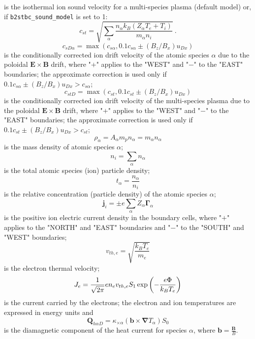 \documentclass[a4paper,10pt]{report}
\begin{document}
is the isothermal ion sound velocity for a multi-species plasma (default model)
or, if {\tt b2stbc\_sound\_model} is set to 1:
\begin{equation}
c_{st}=\sqrt{\sum_{\alpha}\frac{n_\alpha k_{B} \left( Z_\alpha T_e + T_i \right)}{m_\alpha n_i}}~.
\end{equation}
\begin{equation}
c_{sD\alpha}=\max\left(c_{s\alpha},0.1c_{s\alpha}\pm\left( B_{z}/B_{x}\right)
u_{Dx}\right)   \label{11}
\end{equation}
is the conditionally corrected ion drift velocity of the atomic species $\alpha$
due to the poloidal $\mathbf{E \times B}$ drift, where "$+$" applies to the
"WEST" and "$-$" to the "EAST" boundaries; the approximate correction is used only if
$0.1c_{s\alpha}\pm\left( B_{z}/B_{x}\right) u_{Dx}>c_{s\alpha}$;
\begin{equation}
c_{stD}=\max\left(c_{st},0.1c_{st}\pm\left( B_{z}/B_{x}\right) u_{Dx}\right)
\label{12}
\end{equation}
is the conditionally corrected ion drift velocity of the multi-species plasma due
to the poloidal $\mathbf{E \times B}$ drift, where "$+$" applies to the "WEST"
and "$-$" to the "EAST" boundaries; the approximate correction is used only if
$0.1c_{st}\pm\left( B_{z}/B_{x}\right) u_{Dx}>c_{st}$;
\begin{equation}
\rho_{\alpha}=A_{\alpha}m_{p}n_{\alpha}=m_{\alpha}n_{\alpha}   \label{13}
\end{equation}
is the mass density of atomic species $\alpha$;
\begin{equation}
n_{i}=\sum_{\alpha}n_{\alpha}   \label{14}
\end{equation}
is the total atomic species (ion) particle density;
\begin{equation}
t_{\alpha}=\frac{n_{\alpha}}{n_{i}}   \label{15}
\end{equation}
is the relative concentration (particle density) of the atomic species $\alpha$;
\begin{equation}
\mathbf{j}_{i}=\pm e\sum_{\alpha}Z_{\alpha}\mathbf{\Gamma}_{\alpha}
\label{16}
\end{equation}
is the positive ion electric current density in the boundary cells, where
"$+$" applies to the "NORTH" and "EAST" boundaries and "$-$" to
the "SOUTH" and "WEST" boundaries;
\begin{equation}
v_{th,e}=\sqrt{\frac{k_{B}T_{e}}{m_{e}}}   \label{17}
\end{equation}
is the electron thermal velocity;
\begin{equation}
J_{e}=\frac{1}{\sqrt{2\pi}}en_{e}v_{th,e}S_{1}\exp\left( -\frac{e\Phi}{%
k_{B}T_{e}}\right)   \label{18}
\end{equation}
is the current carried by the electrons;
the electron and ion temperatures are expressed in energy units and
\begin{equation}
\mathbf{Q}_{h\alpha D}=\kappa_{\times\alpha}\left( \mathbf{b\times\nabla }
T_{\alpha}\right) S_{0}   \label{20}
\end{equation}
is the diamagnetic component of the heat current for species $\alpha$,
where $\mathbf{b=}\frac{\mathbf{B}}{B}$.
\end{document}
